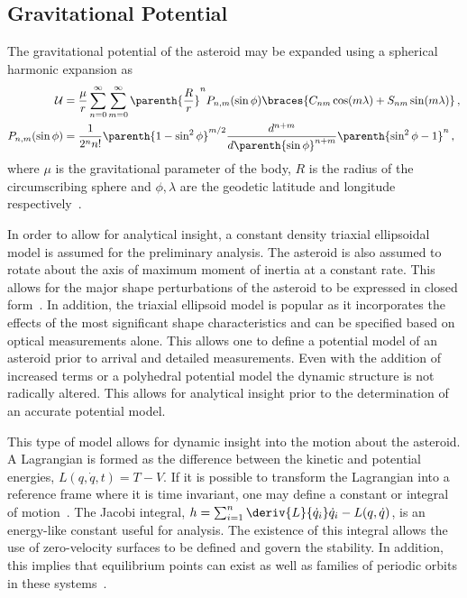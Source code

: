 \documentclass[11pt]{article} %
\begin{document}
\subsection{Gravitational Potential}
The gravitational potential of the asteroid may be expanded using a spherical harmonic expansion as
\begin{align*}
	\mathcal{U} &= \frac{\mu}{r} \sum_{n=0}^\infty \sum_{m=0}^\infty \parenth{\frac{R}{r}}^nP_{n,m}(\sin \phi) \braces{ C_{nm} \cos(m \lambda) + S_{nm} \sin(m \lambda)} \, , \\
	P_{n,m}(\sin \phi) &= \frac{1}{2^n n !} \parenth{1 - \sin^2 \phi}^{m/2} \frac{d^{n+m}}{d \parenth{\sin \phi}^{n+m}} \parenth{\sin^2 \phi -1}^n \, ,
\end{align*}
where \( \mu \) is the gravitational parameter of the body, \( R \) is the radius of the circumscribing sphere and \( \phi, \lambda \) are the geodetic latitude and longitude respectively~\cite{vallado2001}.

In order to allow for analytical insight, a constant density triaxial ellipsoidal model is assumed for the preliminary analysis. 
The asteroid is also assumed to rotate about the axis of maximum moment of inertia at a constant rate.
This allows for the major shape perturbations of the asteroid to be expressed in closed form~\cite{scheeres1994}.
In addition, the triaxial ellipsoid model is popular as it incorporates the effects of the most significant shape characteristics and can be specified based on optical measurements alone.
This allows one to define a potential model of an asteroid prior to arrival and detailed measurements. 
Even with the addition of increased terms or a polyhedral potential model the dynamic structure is not radically altered. 
This allows for analytical insight prior to the determination of an accurate potential model.

This type of model allows for dynamic insight into the motion about the asteroid.
A Lagrangian is formed as the difference between the kinetic and potential energies, \( L(q, \dot{q}, t) =T - V \).
If it is possible to transform the Lagrangian into a reference frame where it is time invariant, one may define a constant or integral of motion~\cite{greenwood1988}.
The Jacobi integral, \( h = \sum_{i=1}^n \deriv{L}{\dot{q}_i} \dot{q}_i - L(q,\dot{q}) \), is an energy-like constant useful for analysis.
The existence of this integral allows the use of zero-velocity surfaces to be defined and govern the stability.
In addition, this implies that equilibrium points can exist as well as families of periodic orbits in these systems~\cite{scheeres2012}.
 
\end{document}
